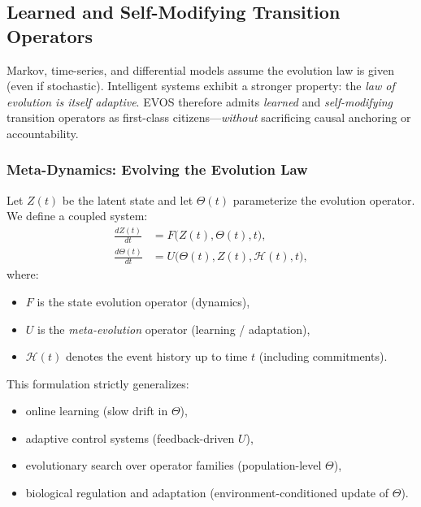 \documentclass[11pt]{article}
\begin{document}


\vspace{3mm}

\subsection{Learned and Self-Modifying Transition Operators}
\label{sec:selfmod}

Markov, time-series, and differential models assume the evolution law is given (even if
stochastic). Intelligent systems exhibit a stronger property: the \emph{law of evolution
is itself adaptive}. EVOS therefore admits \emph{learned} and \emph{self-modifying}
transition operators as first-class citizens---\emph{without} sacrificing causal anchoring
or accountability.

\subsubsection{Meta-Dynamics: Evolving the Evolution Law}
\label{sec:meta-dynamics}

Let $Z(t)$ be the latent state and let $\Theta(t)$ parameterize the evolution operator.
We define a coupled system:
\begin{align}
\frac{dZ(t)}{dt} &= F\!\big(Z(t), \Theta(t), t\big), \label{eq:evos_state_dyn}\\
\frac{d\Theta(t)}{dt} &= U\!\big(\Theta(t), Z(t), \mathcal{H}(t), t\big), \label{eq:evos_meta_dyn}
\end{align}
where:
\begin{itemize}
  \item $F$ is the state evolution operator (dynamics),
  \item $U$ is the \emph{meta-evolution} operator (learning / adaptation),
  \item $\mathcal{H}(t)$ denotes the event history up to time $t$ (including commitments).
\end{itemize}

This formulation strictly generalizes:
\begin{itemize}
  \item online learning (slow drift in $\Theta$),
  \item adaptive control systems (feedback-driven $U$),
  \item evolutionary search over operator families (population-level $\Theta$),
  \item biological regulation and adaptation (environment-conditioned update of $\Theta$).
\end{itemize}
\end{document}
